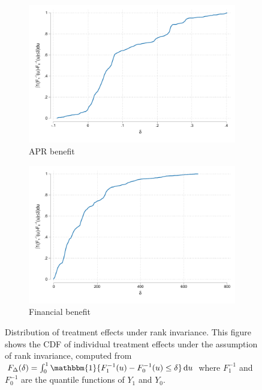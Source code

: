 \begin{appendix}
\begin{figure}
    
    \begin{center}
       \begin{subfigure}{0.49\textwidth}
        \caption{APR benefit}
        \centering
        \includegraphics[width=\textwidth]{Figuras/te_rankinvariance_apr.pdf}
    \end{subfigure} 
   \begin{subfigure}{0.49\textwidth}
        \caption{Financial benefit}
        \centering
        \includegraphics[width=\textwidth]{Figuras/te_rankinvariance_fc_admin.pdf}
    \end{subfigure} 
    \end{center}
    \caption{Distribution of treatment effects under rank invariance. This figure shows the CDF of individual treatment effects under the assumption of rank invariance, computed from $F_\Delta(\delta) = \int_0^1 \mathbbm{1}\{ F_1^{-1}(u) - F_0^{-1}(u)\leq \delta\}\,\mathrm{d}u$ where $F_1^{-1}$ and $F_0^{-1}$ are the quantile functions of $Y_1$ and $Y_0$.}

\end{figure}
\end{appendix}
